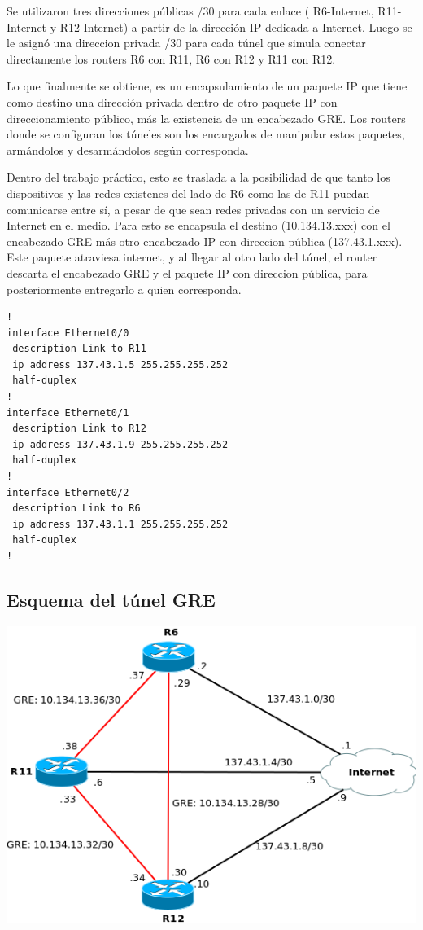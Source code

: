 \documentclass[12pt, a4paper, spanish]{article}
\begin{document}
Se utilizaron tres direcciones públicas /30 para cada enlace ( R6-Internet, 
R11-Internet y R12-Internet) a partir de la dirección IP dedicada a Internet.
Luego se le asignó una direccion privada /30 para cada túnel que simula 
conectar directamente los routers R6 con R11, R6 con R12 y R11 con R12. 

Lo que finalmente se obtiene, es un encapsulamiento de un paquete IP que 
tiene como destino una dirección privada dentro de otro paquete IP con 
direccionamiento público, más la existencia de un encabezado GRE.
Los routers donde se configuran los túneles son los encargados de manipular 
estos paquetes, armándolos y desarmándolos según corresponda.

Dentro del trabajo práctico, esto se traslada a la posibilidad de que tanto 
los dispositivos y las redes existenes del lado de R6 como las de R11 puedan 
comunicarse entre sí, a pesar de que sean redes privadas con un servicio de 
Internet en el medio.
Para esto se encapsula el destino (10.134.13.xxx) con el encabezado GRE más 
otro encabezado IP con direccion pública (137.43.1.xxx).
Este paquete atraviesa internet, y al llegar al otro lado del túnel, 
el router descarta el encabezado GRE y el paquete IP con direccion pública, 
para posteriormente entregarlo a quien corresponda.

{\small
\begin{verbatim}
!
interface Ethernet0/0
 description Link to R11
 ip address 137.43.1.5 255.255.255.252
 half-duplex
!
interface Ethernet0/1
 description Link to R12
 ip address 137.43.1.9 255.255.255.252
 half-duplex
!
interface Ethernet0/2
 description Link to R6
 ip address 137.43.1.1 255.255.255.252
 half-duplex
!
\end{verbatim}
}

\subsection{Esquema del túnel GRE}
\begin{center}
	\includegraphics[scale=0.70]{diagramas/Tunel_GRE.png} \\
\end{center}
\end{document}
